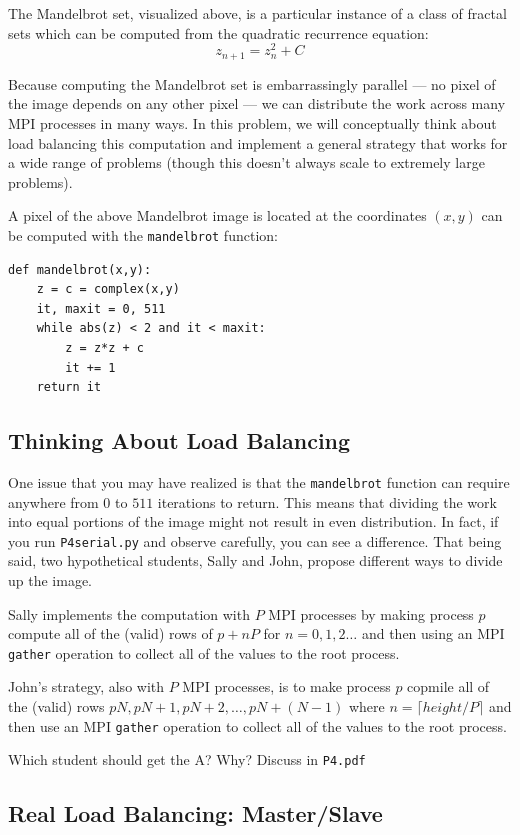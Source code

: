 \documentclass[12pt]{article}
\begin{document}
The Mandelbrot set, visualized above, is a particular instance of a class of fractal sets which can be computed from the quadratic recurrence equation:
$$
z_{n+1} = z_n^2 + C
$$

Because computing the Mandelbrot set is embarrassingly parallel --- no pixel of the image depends on any other pixel --- we can distribute the work across many MPI processes in many ways.  In this problem, we will conceptually think about load balancing this computation and implement a general strategy that works for a wide range of problems (though this doesn't always scale to extremely large problems).

A pixel of the above Mandelbrot image is located at the coordinates $(x,y)$ can be computed with the \texttt{mandelbrot} function:

\begin{lstlisting}
def mandelbrot(x,y):
	z = c = complex(x,y)
	it, maxit = 0, 511
	while abs(z) < 2 and it < maxit:
		z = z*z + c
		it += 1
	return it
\end{lstlisting}

\subsection*{Thinking About Load Balancing}

One issue that you may have realized is that the \texttt{mandelbrot} function can require anywhere from $0$ to $511$ iterations to return.  This means that dividing the work into equal portions of the image might not result in even distribution.  In fact, if you run \texttt{P4serial.py} and observe carefully, you can see a difference.  That being said, two hypothetical students, Sally and John, propose different ways to divide up the image. 

Sally implements the computation with $P$ MPI processes by making process $p$ compute all of the (valid) rows of $p+nP$ for $n=0,1,2 \hdots$ and then using an MPI \texttt{gather} operation to collect all of the values to the root process. 

John's strategy, also with $P$ MPI processes, is to make process $p$ copmile all of the (valid) rows $pN, pN+1, pN+2, \hdots, pN+(N-1)$ where $n = \lceil height/P \rceil$ and then use an MPI \texttt{gather} operation to collect all of the values to the root process.

Which student should get the A?  Why?  Discuss in \texttt{P4.pdf}

\subsection*{Real Load Balancing: Master/Slave}
\end{document}
